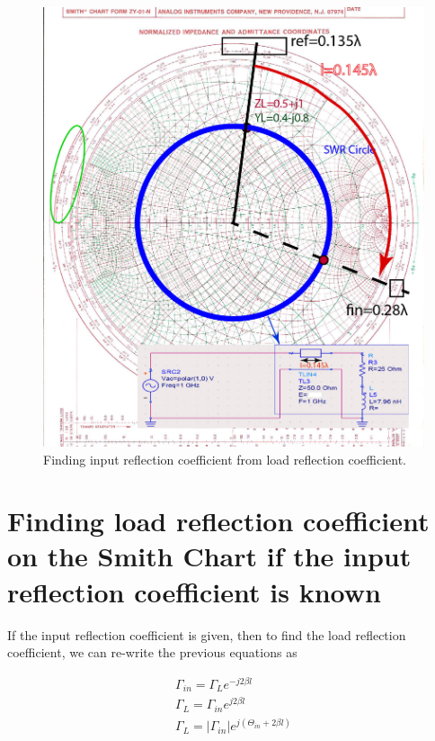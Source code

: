 \documentclass{ximera}
\begin{document}
\begin{figure}[htbp]
\begin{center}
\includegraphics[scale=0.8]{../jpg/InputImpedance2-01.jpg}
\end{center}
\caption{Finding input reflection coefficient from load reflection coefficient.}
\label{fig:SCImpRefCoeff}
\end{figure}

\newpage
\section{Finding load reflection coefficient on the Smith Chart if the input reflection coefficient is known}

If the input reflection coefficient is given, then to find the load reflection coefficient, we can re-write the previous equations as


\begin{eqnarray}
\Gamma_{in}=\Gamma_L e^{-j2 \beta l} \\
\Gamma_{L} = \Gamma_{in}  e^{j2 \beta l} \\
\Gamma_{L} = |\Gamma_{in}| e^{j(\Theta_{in} +2 \beta l) } 
\end{eqnarray}
\end{document}
